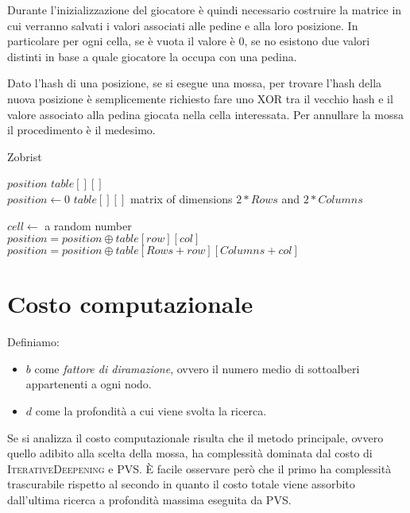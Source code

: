 \documentclass[a4paper]{article}
\begin{document}
Durante l'inizializzazione del giocatore è quindi necessario costruire la 
matrice in cui verranno salvati i valori associati alle pedine e alla loro 
posizione. In particolare per ogni cella, se è vuota il valore è 0, se no 
esistono due valori distinti in base a quale giocatore la occupa con una pedina.

Dato l'hash di una posizione, se si esegue una mossa, per trovare l'hash della
nuova posizione è semplicemente richiesto fare uno XOR tra il vecchio hash e il
valore associato alla pedina giocata nella cella interessata. Per annullare la
mossa il procedimento è il medesimo.

\begin{algorithm}
  \caption{Zobrist}
  \begin{algorithmic}
    \State $position$
    \State $table[][]$
    \\
      \State $position \gets 0$
      \State $table[][]$ matrix of dimensions $2 * Rows$ and $2 * Columns$

      \State $cell \gets $ a random number
      \EndFor
    \EndFunction
    \\
        \State $position = position \oplus table[row][col]$
      \Else
        \State $position = position \oplus table[Rows + row][Columns + col]$
      \EndIf
    \EndFunction
  \end{algorithmic}
\end{algorithm}

\section{Costo computazionale}
Definiamo:
\begin{itemize}
  \item $b$ come \emph{fattore di diramazione}, ovvero il numero medio di
    sottoalberi appartenenti a ogni nodo.
  \item $d$ come la profondità a cui viene svolta la ricerca.
\end{itemize}

Se si analizza il costo computazionale risulta che il metodo principale, ovvero 
quello adibito alla scelta della mossa, ha complessità  dominata  dal costo di
\textsc{IterativeDeepening} e \textsc{PVS}. È facile osservare però che il primo 
ha complessità trascurabile rispetto al secondo in quanto il costo totale viene
assorbito dall'ultima ricerca a profondità massima eseguita da PVS. 
\end{document}
